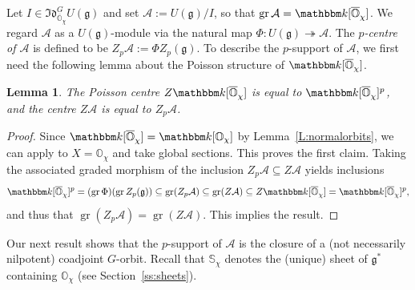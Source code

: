 \documentclass[twoside,12pt,reqno]{amsart}
\newtheorem{Lemma}[Theorem]{Lemma}
\theoremstyle{remark}
\numberwithin{equation}{section}
\def\onto{\twoheadrightarrow}
\def\k{{\mathbbm k}}
\def\gr{\operatorname{gr}}
\def\o{\overline}
\def\O{{\mathbb O}}
\def\cO{{\overline{\mathbb O}}}
\def\bbS{\mathbb{S}}
\def\g{{\mathfrak g}}
\def\Idl{\mathfrak{Id}}
\def\cA{\mathcal{A}}
\newcommand{\A}{\mathcal{A}}
\begin{document}
Let $I \in \Idl_{\overline{\O}_\chi}^G U(\g)$ and set $\A := U(\g)/ I$, so that $\gr \A = \k[\o\O_\chi]$. We regard $\A$ as a $U(\g)$-module via the natural map $\Phi : U(\g) \onto \A$. The {\it $p$-centre of $\A$} is defined to be $Z_p\A := \Phi Z_p(\g)$. To describe the $p$-support of $\cA$, we first need the following lemma about the Poisson structure of $\k[\o\O_\chi]$.
\begin{Lemma}
\label{L:casimirspthpowers}
The Poisson centre $Z\k[\cO_\chi]$ is equal to $\k[\cO_\chi]^p$, and the centre $Z\A$ is equal to $Z_p\A$.
\end{Lemma}
\begin{proof}
Since $\k[\cO_\chi]=\k[\O_\chi]$ by Lemma~\ref{L:normalorbits}, we can apply \cite[Lemma~1.10]{BeKa} to $X=\O_\chi$ and take global sections. This proves the first claim. Taking the associated graded morphism of the inclusion $Z_p\cA\subseteq Z\cA$ yields inclusions $$ \k[\cO_\chi]^p=(\gr\Phi)(\gr Z_p(\g))\subseteq \gr(Z_p\cA)\subseteq \gr(Z \cA)\subseteq Z\k[\cO_\chi]=\k[\cO_\chi]^p,$$ and thus that $\gr(Z_p\cA)=\gr(Z\cA)$. This implies the result.
\end{proof}

Our next result shows that the $p$-support of $\cA$ is the closure of a (not necessarily nilpotent) coadjoint $G$-orbit. Recall that $\bbS_\chi$ denotes the (unique) sheet of $\g^*$ containing $\O_\chi$ (see Section~\ref{ss:sheets}).
\end{document}
